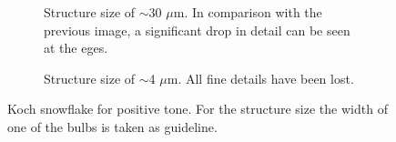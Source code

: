 \begin{figure}[!t]
\begin{subfigure}[t]{0.32\linewidth}
  	\caption{Structure size of $\sim$30 $\mu$m. In comparison with the previous image, a significant drop in detail can be seen at the eges.}
  	\label{fig:b2d20_q20}
  \end{subfigure}
\hfill
     \begin{subfigure}[t]{0.32\linewidth}
  	\caption{Structure size of $\sim$4 $\mu$m. All fine details have been lost.}
  	\label{fig:b2d21_q21}
  \end{subfigure}
\caption{Koch snowflake for positive tone. For the structure size the width of one of the bulbs is taken as guideline.}
 \end{figure}









